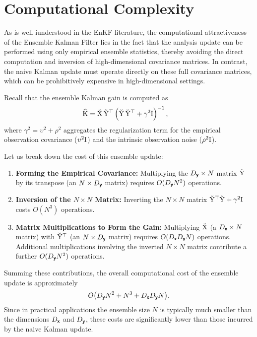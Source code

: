 \documentclass[wcp]{jmlr} %
\begin{document}
\section{Computational Complexity}

As is well iunderstood in the EnKF literature, the computational attractiveness of the Ensemble Kalman Filter lies in the fact that the analysis update can be performed using only empirical ensemble statistics, thereby avoiding the direct computation and inversion of high-dimensional covariance matrices.
In contrast, the naive Kalman update must operate directly on these full covariance matrices, which can be prohibitively expensive in high-dimensional settings.

Recall that the ensemble Kalman gain is computed as
\begin{align}
    \widehat{\mathrm{K}} &= \breve{\mathrm{X}}\,\breve{\mathrm{Y}}^\top \left(\breve{\mathrm{Y}}\,\breve{\mathrm{Y}}^\top + \gamma^2\mathrm{I}\right)^{-1},
\end{align}
where \(\gamma^2 = \upsilon^2 + \rho^2\) aggregates the regularization term for the empirical observation covariance (\(\upsilon^2\mathrm{I}\)) and the intrinsic observation noise (\(\rho^2\mathrm{I}\)).

Let us break down the cost of this ensemble update:

\begin{enumerate}
    \item \textbf{Forming the Empirical Covariance:}
    Multiplying the \(D_{\boldsymbol{\mathsf{y}}}\times N\) matrix \(\breve{\mathrm{Y}}\) by its transpose (an \(N\times D_{\boldsymbol{\mathsf{y}}}\) matrix) requires \(O(D_{\boldsymbol{\mathsf{y}}}N^2)\) operations.

    \item \textbf{Inversion of the \(N\times N\) Matrix:}
    Inverting the \(N\times N\) matrix \(\breve{\mathrm{Y}}^\top \breve{\mathrm{Y}} + \gamma^2\mathrm{I}\) costs \(O(N^3)\) operations.

    \item \textbf{Matrix Multiplications to Form the Gain:}
    Multiplying \(\breve{\mathrm{X}}\) (a \(D_{\boldsymbol{\mathsf{x}}}\times N\) matrix) with \(\breve{\mathrm{Y}}^\top\) (an \(N\times D_{\boldsymbol{\mathsf{y}}}\) matrix) requires \(O(D_{\boldsymbol{\mathsf{x}}}D_{\boldsymbol{\mathsf{y}}}N)\) operations. Additional multiplications involving the inverted \(N\times N\) matrix contribute a further \(O(D_{\boldsymbol{\mathsf{y}}}N^2)\) operations.
\end{enumerate}

Summing these contributions, the overall computational cost of the ensemble update is approximately
\[
    O\bigl(D_{\boldsymbol{\mathsf{y}}}N^2 + N^3 + D_{\boldsymbol{\mathsf{x}}}D_{\boldsymbol{\mathsf{y}}}N\bigr).
\]
Since in practical applications the ensemble size \(N\) is typically much smaller than the dimensions \(D_{\boldsymbol{\mathsf{x}}}\) and \(D_{\boldsymbol{\mathsf{y}}}\), these costs are significantly lower than those incurred by the naive Kalman update.
\end{document}
